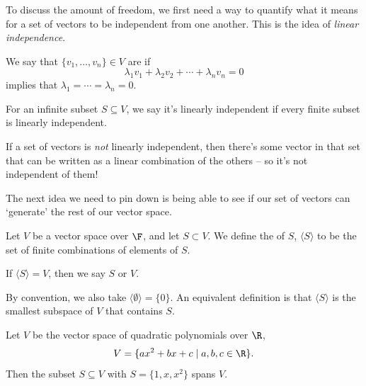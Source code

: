 To discuss the amount of freedom, we first need a way to quantify what it means for a set of vectors to be independent from one another. This is the idea of \emph{linear independence}.


\begin{definition}
We say that $\{v_1, \dots, v_n\} \in V$ are  if
$$
\lambda_1 v_1 + \lambda_2 v_2 + \cdots + \lambda_n v_n = 0
$$
implies that $\lambda_1 = \cdots = \lambda_n = 0$.
\end{definition}

\begin{remark}
    For an infinite subset $S \subseteq V$, we say it's linearly independent if every finite subset is linearly independent.
\end{remark}

If a set of vectors is \emph{not} linearly independent, then there's some vector in that set that can be written as a linear combination of the others -- so it's not independent of them!

The next idea we need to pin down is being able to see if our set of vectors can `generate' the rest of our vector space. 


\begin{definition}[Span]
    Let $V$ be a vector space over $\F$, and let $S \subset V$. We define the  of $S$, $\langle S \rangle$ to be the set of finite combinations of elements of $S$.

    If $\langle S \rangle = V$, then we say $S$  or  $V$.
\end{definition}

\begin{remark}
    By convention, we also take $\langle \emptyset \rangle = \{ 0\}$. An equivalent definition is that $\langle S \rangle$ is the smallest subspace of $V$ that contains $S$.
\end{remark}

\begin{example}
    Let $V$ be the vector space of quadratic polynomials over $\R$, 
    $$V = \{ax^2 + bx + c \mid a, b, c \in \R\}.$$ 
    Then the subset $S \subseteq V$ with $S = \{1, x, x^2\}$ spans $V$.
\end{example}


